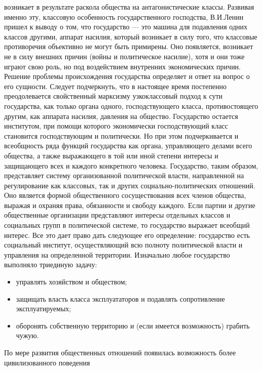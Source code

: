 \documentclass[12pt]{article}
\begin{document}
возникает  в  результате  раскола  общества  на  антагонистические  классы.  Развивая  именно  эту,  классовую
особенность государственного господства, В.И.Ленин пришел к выводу о том, что государство --- это машина для
подавления  одних  классов  другими,  аппарат  насилия,  который  возникает  в  силу  того,  что  классовые
противоречия объективно не могут быть примирены. Оно появляется, возникает не в силу внешних причин
(войны  и  политическое  насилие),  хотя  и  они  тоже  играют  свою  роль,  но  под  воздействием  внутренних
экономических причин.
Решение  проблемы  происхождения  государства  определяет  и  ответ  на  вопрос  о  его  сущности.  Следует
подчеркнуть,  что  в  настоящее  время  постепенно  преодолевается  свойственный  марксизму  узкоклассовый
подход к сути государства, как только органа одного, господствующего класса, противостоящего другим, как
аппарата  насилия,  давления  на  общество.  Государство  остается  институтом,  при  помощи  которого
экономически господствующий класс становится господствующим и политически. Но при этом подчеркивается
и  всеобщность  ряда  функций  государства  как  органа,  управляющего  делами  всего  общества,  а  также
выражающего  в  той  или  иной  степени  интересы  и  защищающего  всех  и  каждого  конкретного  человека. 
Государство,  таким  образом,  представляет  систему  организованной  политической  власти,  направленной  на
регулирование  как  классовых,  так  и  других  социально-политических  отношений.  Оно  является  формой
общественного  сосуществования  всех  членов  общества,  выражая  и  охраняя  права,  обязанности  и  свободу
каждого.  Если  партии  и  другие  общественные  организации  представляют  интересы  отдельных  классов  и
социальных групп в политической системе, то государство выражает всеобщий интерес.
Все это дает право дать следующее его определение: государство есть социальный институт, осуществляющий
всю полноту политической власти и управления на определенной территории.
Изначально любое государство выполняло триединую задачу:
\begin{itemize}
  \item управлять хозяйством и обществом; 
  \item защищать власть класса эксплуататоров и подавлять сопротивление эксплуатируемых; 
  \item оборонять собственную территорию и (если имеется возможность) грабить чужую. 
\end{itemize}
По  мере  развития  общественных  отношений  появилась  возможность  более  цивилизованного  поведения
\end{document}
